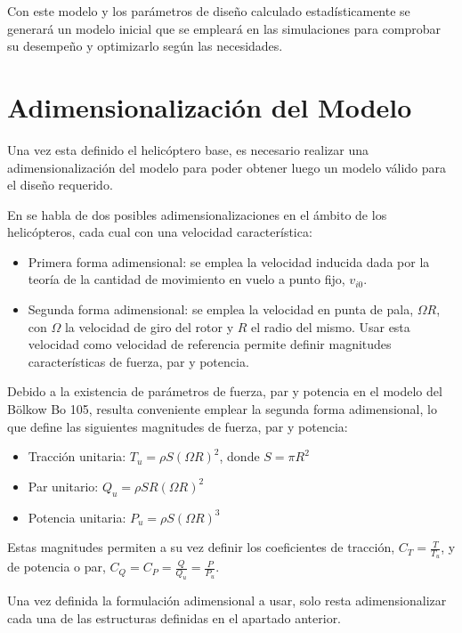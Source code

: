 Con este modelo y los parámetros de diseño calculado estadísticamente se generará un modelo inicial que se empleará en las simulaciones para comprobar su desempeño y optimizarlo según las necesidades.

\section{Adimensionalización del Modelo}

Una vez esta definido el helicóptero base, es necesario realizar una adimensionalización del modelo para poder obtener luego un modelo válido para el diseño requerido.

En \citet{Cuerva} se habla de dos posibles adimensionalizaciones en el ámbito de los helicópteros, cada cual con una velocidad característica:

\begin{itemize}
	\item Primera forma adimensional: se emplea la velocidad inducida dada por la teoría de la cantidad de movimiento en vuelo a punto fijo, $v_{i0}$.
	\item Segunda forma adimensional: se emplea la velocidad en punta de pala, $\Omega R$, con $\Omega$ la velocidad de giro del rotor y $R$ el radio del mismo. Usar esta velocidad como velocidad de referencia permite definir magnitudes características de fuerza, par y potencia.
\end{itemize}

Debido a la existencia de parámetros de fuerza, par y potencia en el modelo del Bölkow Bo 105, resulta conveniente emplear la segunda forma adimensional, lo que define las siguientes magnitudes de fuerza, par y potencia:

\begin{itemize}
	\item Tracción unitaria: $T_u=\rho S(\Omega R)^2$, donde $S=\pi R^2$
	\item Par unitario: $Q_u=\rho SR(\Omega R)^2$
	\item Potencia unitaria: $P_u=\rho S(\Omega R)^3$
\end{itemize}

Estas magnitudes permiten a su vez definir los coeficientes de tracción, $C_T=\frac{T}{T_u}$, y de potencia o par, $C_Q=C_P=\frac{Q}{Q_u}=\frac{P}{P_u}$.

Una vez definida la formulación adimensional a usar, solo resta adimensionalizar cada una de las estructuras definidas en el apartado anterior.

